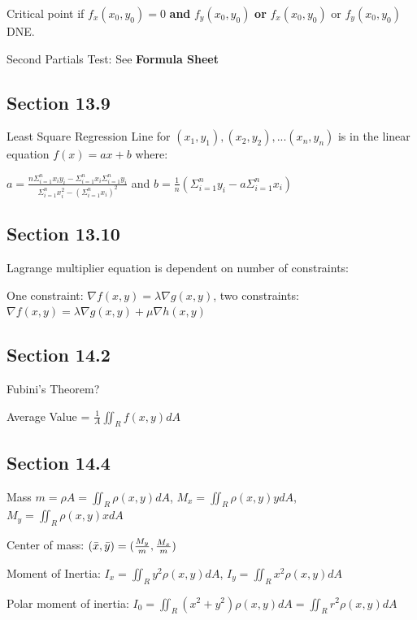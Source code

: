 \documentclass{article}
\begin{document}
\par\noindent\large Critical point if $f_{x}(x_{0}, y_{0}) = 0$ \textbf{and} $f_{y}(x_{0}, y_{0})$ \textbf{or} $f_{x}(x_{0}, y_{0})$ or $f_{y}(x_{0}, y_{0})$ DNE.\vspace{0.25cm}

\par\noindent\large Second Partials Test: See \textbf{Formula Sheet}

\subsection{Section 13.9}
\par\noindent\large Least Square Regression Line for ${(x_{1}, y_{1}), (x_{2}, y_{2}), ... (x_{n}, y_{n})}$ is in the linear equation $f(x) = ax + b$ where:
\par\noindent\huge $a = \frac{n\Sigma_{i = 1}^{n}x_{i}y_{i} - \Sigma_{i = 1}^{n}x_{i}\Sigma_{i = 1}^{n}y_{i}}{\Sigma_{i = 1}^{n}x_{i}^{2} - (\Sigma_{i = 1}^{n}x_{i})^{2}}$ and $b = \frac{1}{n}(\Sigma_{i = 1}^{n}y_{i} - a\Sigma_{i = 1}^{n}x_{i})$

\subsection{Section 13.10}
\par\noindent\large Lagrange multiplier equation is dependent on number of constraints:
\par\noindent\large One constraint: $\nabla f(x, y) = \lambda\nabla g(x, y)$, two constraints: $\nabla f(x, y) = \lambda\nabla g(x, y) + \mu\nabla h(x, y)$

\subsection{Section 14.2}
\par\noindent\large Fubini's Theorem?
\par\noindent\Large Average Value = $\frac{1}{A}\iint_{R} f(x, y) dA$

\subsection{Section 14.4}
\par\noindent\Large Mass $m = \rho A = \iint_{R}\rho(x, y)dA$, $M_{x} = \iint_{R}\rho(x, y)ydA$, $M_{y} = \iint_{R}\rho(x, y)xdA$
\par\noindent\Large Center of mass: $(\Bar{x}, \Bar{y}) = (\frac{M_{y}}{m}, \frac{M_{x}}{m})$
\par\noindent\Large Moment of Inertia: $I_{x} = \iint_{R}y^{2}\rho(x, y)dA$, $I_{y} = \iint_{R}x^{2}\rho(x, y)dA$
\par\noindent\Large Polar moment of inertia: $I_{0} = \iint_{R}(x^{2} + y^{2})\rho(x, y)dA = \iint_{R}r^{2}\rho(x, y)dA$
\end{document}
